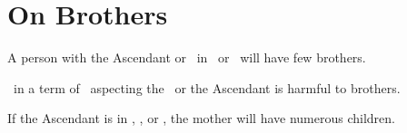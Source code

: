 \section{On Brothers}
A person with the Ascendant or \Moon\, in \Leo\, or \Sagittarius\, will have few brothers.

\Mercury\, in a term of \Mars\, aspecting the \Moon\, or the Ascendant is harmful to brothers.

If the Ascendant is in \Scorpio, \Cancer, or \Pisces, the mother will have numerous children.